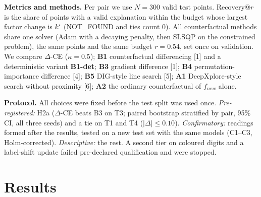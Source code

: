 \documentclass{esannV2}
\begin{document}
\textbf{Metrics and methods.} Per pair we use $N=300$ valid test points. $\mathrm{Recovery@}r$ is the share of points with a valid explanation within the budget whose largest factor change is $k^\star$ (NOT\_FOUND and ties count 0). All counterfactual methods share one solver (Adam with a decaying penalty, then SLSQP on the constrained problem), the same points and the same budget $r=0.54$, set once on validation. We compare $\Delta$-CE ($\kappa=0.5$); \textbf{B1} counterfactual differencing [1] and a deterministic variant \textbf{B1-det}; \textbf{B3} gradient difference [1]; \textbf{B4} permutation-importance difference [4]; \textbf{B5} DIG-style line search [5]; \textbf{A1} DeepXplore-style search without proximity [6]; \textbf{A2} the ordinary counterfactual of $f_{new}$ alone.

\textbf{Protocol.} All choices were fixed before the test split was used once. \emph{Pre-registered:} H2a ($\Delta$-CE beats B3 on T3; paired bootstrap stratified by pair, 95\% CI, all three seeds) and a tie on T1 and T4 ($|\Delta|\le0.10$). \emph{Confirmatory:} readings formed after the results, tested on a new test set with the same models (C1--C3, Holm-corrected). \emph{Descriptive:} the rest. A second tier on coloured digits and a label-shift update failed pre-declared qualification and were stopped.

\section{Results}

\begin{table}[t]
\caption{Recovery@$r$ (found-rate) on the locked test split, mean over three pairs; all 95\% bootstrap CIs within $\pm0.035$. Last row: found-rate on the 8 null pairs.}
\label{tab:results}
\centering\small
{}
\end{table}
\end{document}
